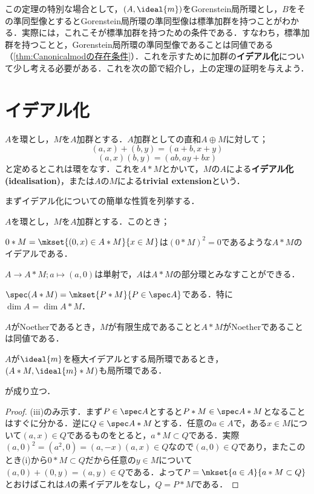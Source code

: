 この定理の特別な場合として，$(A,\ideal{m})$をGorenstein局所環とし，$B$をその準同型像とするとGorenstein局所環の準同型像は標準加群を持つことがわかる．実際には，これこそが標準加群を持つための条件である．すなわち，標準加群を持つことと，Gorenstein局所環の準同型像であることは同値である（\ref{thm:Canonicalmodの存在条件}）．これを示すために加群の\textbf{イデアル化}について少し考える必要がある．これを次の節で紹介し，上の定理の証明を与えよう．

\section{イデアル化}

\begin{defi}[イデアル化]\label{defi:idealisation}
	$A$を環とし，$M$を$A$加群とする．$A$加群としての直和$A\oplus M$に対して；
	\[(a,x)+(b,y)=(a+b,x+y)\]
	\[(a,x)(b,y)=(ab,ay+bx)\]
	と定めるとこれは環をなす．これを$A*M$とかいて，$M$の$A$による\textbf{イデアル化(idealisation)}，または$A$の$M$による\textbf{trivial extension}という．
\end{defi}

まずイデアル化についての簡単な性質を列挙する．

\begin{prop}
	$A$を環とし，$M$を$A$加群とする．このとき；
	\begin{sakura}
		\item $0*M=\mkset{(0,x)\in A*M}{x\in M}$は$(0*M)^2=0$であるような$A*M$のイデアルである．
		\item $A\to A*M;a\mapsto (a,0)$は単射で，$A$は$A*M$の部分環とみなすことができる．
		\item $\spec (A*M)=\mkset{P*M}{P\in\spec A}$である．特に$\dim A=\dim A*M$．
		\item $A$がNoetherであるとき，$M$が有限生成であることと$A*M$がNoetherであることは同値である．
		\item $A$が$\ideal{m}$を極大イデアルとする局所環であるとき，$(A*M,\ideal{m}*M)$も局所環である．
	\end{sakura}
	が成り立つ．
\end{prop}

\begin{proof}
	(iii)のみ示す．まず$P\in\spec A$とすると$P*M\in\spec A*M$となることはすぐに分かる．逆に$Q\in\spec A*M$とする．任意の$a\in A$で，ある$x\in M$について$(a,x)\in Q$であるものをとると，$a*M\subset Q$である．実際$(a,0)^2=(a^2,0)=(a,-x)(a,x)\in Q$なので$(a,0)\in Q$であり，またこのとき(i)から$0*M\subset Q$だから任意の$y\in M$について$(a,0)+(0,y)=(a,y)\in Q$である．よって$P=\mkset{a\in A}{a*M\subset Q}$とおけばこれは$A$の素イデアルをなし，$Q=P*M$である．
\end{proof}

